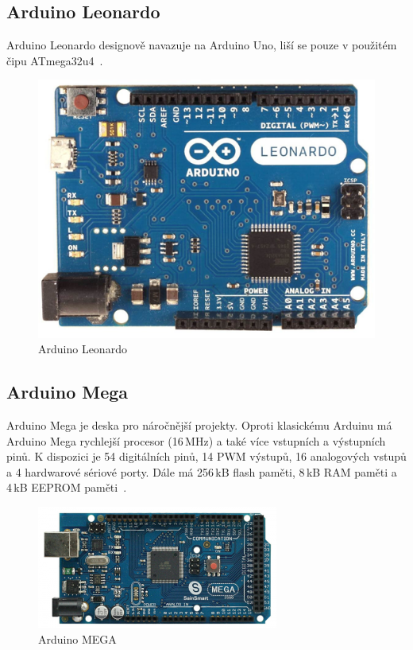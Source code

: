 		\subsection{Arduino Leonardo} 
		Arduino Leonardo designově navazuje na Arduino Uno, liší se pouze v použitém čipu ATmega32u4~\cite{ArduinoLeonardo}.
				\begin{figure}[!h]
  \begin{center}
    \includegraphics[scale=0.3]{obrazky/emded_arduino_leonardo}
  \end{center}
  \caption{Arduino Leonardo~\cite{ArduinoLeonardo}}
\end{figure}
		
					\subsection{Arduino Mega} 
					Arduino Mega je deska pro náročnější projekty. Oproti klasickému Arduinu má Arduino Mega rychlejší procesor (16\,MHz) a také více vstupních a výstupních pinů. K dispozici je 54 digitálních pinů, 14 PWM výstupů, 16 analogových vstupů a 4 hardwarové sériové porty. Dále má 256\,kB flash paměti, 8\,kB RAM paměti a 4\,kB EEPROM paměti~\cite{ArduinoMega}.	
			
			\begin{figure}[!h]
  \begin{center}
    \includegraphics[scale=0.8]{obrazky/emded_arduino_mega}
  \end{center}
  \caption{Arduino MEGA~\cite{ArduinoMega}}
\end{figure}


